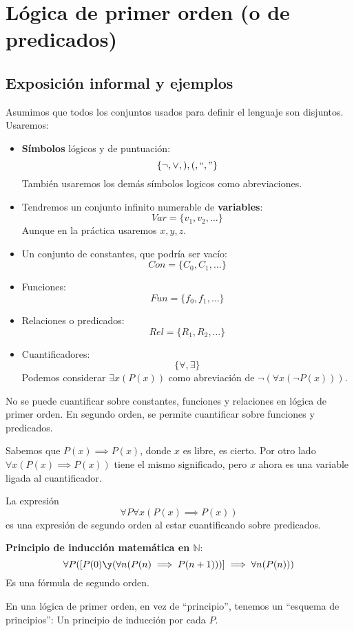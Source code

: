 \section{Lógica de primer orden (o de predicados)}
\subsection{Exposición informal y ejemplos}
Asumimos que todos los conjuntos usados para definir el lenguaje son disjuntos. Usaremos:
\begin{itemize}
	\item \textbf{Símbolos} lógicos y de puntuación:
	$$\{\neg, \vee, ),(, ``," \}$$
	También usaremos los demás símbolos logicos como abreviaciones.
	\item Tendremos un conjunto infinito numerable de \textbf{variables}:
	$$Var = \{v_1, v_2, \hdots\}$$
	Aunque en la práctica usaremos $x,y,z$.
	\item Un conjunto de constantes, que podría ser vacío:
	$$Con = \{C_0, C_1, \hdots\}$$
	\item Funciones:
	$$Fun = \{f_0, f_1, \hdots\}$$
	\item Relaciones o predicados:
	$$Rel = \{R_1, R_2, \hdots\}$$
	\item Cuantificadores:
	$$\{\forall, \exists\}$$
	Podemos considerar $\exists x(P(x))$ como abreviación de $\neg (\forall x(\neg P(x)))$.
\end{itemize} 

No se puede cuantificar sobre constantes, funciones y relaciones en lógica de primer orden. En segundo orden, se permite cuantificar sobre funciones y predicados.

\begin{example} 

Sabemos que $P(x) \implies P(x)$, donde $x$ es libre, es cierto. Por otro lado $\forall x(P(x)\implies P(x))$ tiene el mismo significado, pero $x$ ahora es una variable ligada al cuantificador.
\end{example}

\begin{example} 

La expresión 
\[\forall P \forall x (P(x)\implies P(x))\]
es una expresión de segundo orden al estar cuantificando sobre predicados.
\end{example}

\begin{mdframed}
	\textbf{Principio de inducción matemática en $\mathbb{N}$}:
	$$\forall P (\left[P(0)\y (\forall n(P(n)\implies P(n+1)))\right]\implies \forall n(P(n)))$$
	Es una fórmula de segundo orden.
\end{mdframed}
En una lógica de primer orden, en vez de ``principio'', tenemos un ``esquema de principios'': Un principio de inducción por cada $P$.

